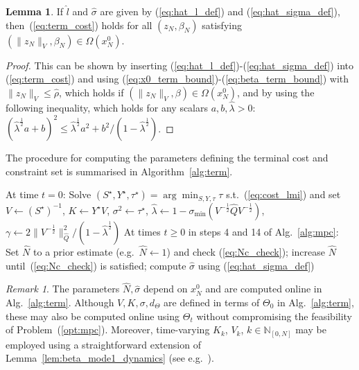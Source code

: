 \documentclass{IEEEtran}
\makeatletter
\newcommand{\removelatexerror}{\let\@latex@error\@gobble}
\theoremstyle{definition}
\newtheorem{lemma}{Lemma}
\theoremstyle{remark}
\newtheorem{remark}{Remark}
\makeatother
\begin{document}
\begin{lemma}\label{lem:term_cost}
If $\hat{l}$ and $\hat{\sigma}$ are given by (\ref{eq:hat_l_def}) and (\ref{eq:hat_sigma_def}), then~(\ref{eq:term_cost}) holds for all $(z_N,\beta_N)$ satisfying $(\|z_N\|_V,\beta_N)\in\Omega(x^0_N)$.
\end{lemma}

\begin{proof}
This can be shown by inserting (\ref{eq:hat_l_def})-(\ref{eq:hat_sigma_def}) into (\ref{eq:term_cost}) and using (\ref{eq:x0_term_bound})-(\ref{eq:beta_term_bound}) with $\|z_N\|_V\leq \hat{\rho}$, which holds if $(\|z_N\|_V,\beta)\in\Omega(x^0_N)$, and by using the following inequality, which holds for any scalars $a,b,\hat{\lambda}>0$:
$(\hat{\lambda}^{\frac{1}{2}}a + b)^2 \leq 
\hat{\lambda}^{\frac{1}{2}} a^2 + b^2/(1-\hat{\lambda}^{\frac{1}{2}})$.
\end{proof}%

The procedure for computing the parameters defining the terminal cost and constraint set is summarised in Algorithm~\ref{alg:term}.%

{\setlength{\algomargin}{1em}
\removelatexerror
\begin{algorithm2e}
\DontPrintSemicolon
{}
{
At time $t=0$: Solve $(S^\star,Y^\star, \tau^\star) = \arg\min_{S,Y,\tau} \tau$ s.t.~(\ref{eq:cost_lmi}) and set $V\gets (S^\star)^{-1}$, $K\gets Y^\star V$, $\sigma^2 \gets \tau^\star$, 
$\hat{\lambda} \gets 1 - \sigma_{\min} ( V^{-\frac{1}{2}} \hat{Q} V^{-\frac{1}{2}} )$,
$\gamma \gets 2\|V^{-\frac{1}{2}}\|_{\hat{Q}}^2/(1-\hat{\lambda}^{\frac{1}{2}\!})$\;
At times $t\geq 0$ in steps 4 and 14 of Alg.~\ref{alg:mpc}: 
Set $\hat{N}$ to a prior estimate (e.g.~$\hat{N}\gets 1$) and check (\ref{eq:Nc_check}); increase $\hat{N}$ until~(\ref{eq:Nc_check}) is satisfied; 
compute $\hat{\sigma}$ using (\ref{eq:hat_sigma_def})
}
\caption{Computation of terminal parameters}\label{alg:term}
\end{algorithm2e}}

\begin{remark}\label{rem:terminal_update} 
The parameters $\hat{N},\hat{\sigma}$
depend on $x^0_N$ and are computed online in Alg.~\ref{alg:term}.
%
Although $V,K,\sigma,d_\Theta$ are defined in terms of $\Theta_0$ in Alg.~\ref{alg:term}, these may also be computed online using $\Theta_t$ without compromising the feasibility of Problem~(\ref{opt:mpc}). 
%
Moreover, time-varying $K_k$, $V_k$, $k\in\mathbb{N}_{[0,N]}$ may be employed using a straightforward extension of Lemma~\ref{lem:beta_mode1_dynamics} (see e.g.~\cite{Can11}).
\end{remark}
\end{document}
